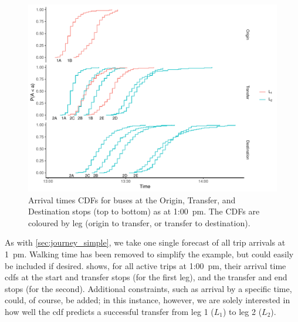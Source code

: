 \begin{knitrout}\small
{}\color{fgcolor}\begin{figure}

{\centering \includegraphics[width=\textwidth]{figure/eta_journey_transfer_graph-1} 

}

\caption[Arrival times CDFs for buses at the Origin, Transfer, and Destination stops]{Arrival times CDFs for buses at the Origin, Transfer, and Destination stops (top to bottom) as at 1:00~pm. The CDFs are coloured by leg (origin to transfer, or transfer to destination).}\label{fig:eta_journey_transfer_graph}
\end{figure}


\end{knitrout}


As with \cref{sec:journey_simple}, we take one single forecast of all trip arrivals at 1~pm. Walking time has been removed to simplify the example, but could easily be included if desired.  shows, for all active trips at  1:00~pm, their arrival time \glspl{cdf} at the start and transfer stops (for the first leg), and the transfer and end stops (for the second). Additional constraints, such as arrival by a specific time, could, of course, be added; in this instance, however, we are solely interested in how well the \pf{} \gls{cdf} predicts a successful transfer from leg 1 ($L_1$) to leg 2 ($L_2$).


